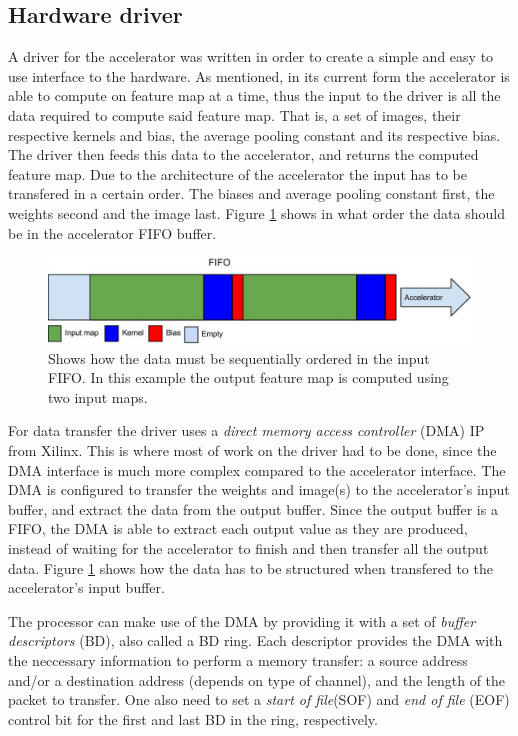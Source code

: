 \subsection{Hardware driver} \label{sec_hardware_driver}

A driver for the accelerator was written in order to create a simple and easy to use interface to the hardware. As mentioned, in its current form the accelerator is able to compute on feature map at a time, thus the input to the driver is all the data required to compute said feature map. That is, a set of images, their respective kernels and bias, the average pooling constant and its respective bias. The driver then feeds this data to the accelerator, and returns the computed feature map. Due to the architecture of the accelerator the input has to be transfered in a certain order. The biases and average pooling constant first, the weights second and the image last. Figure \ref{fig_fifo_content} shows in what order the data should be in the accelerator FIFO buffer.


\begin{figure}[h!]
  \centering
      \includegraphics[width=1.0\textwidth]{Figures/Method/FIFO_content}
    \caption{Shows how the data must be sequentially ordered in the input FIFO. In this example the output feature map is computed using two input maps.}
    \label{fig_fifo_content}
\end{figure}

For data transfer the driver uses a \textit{direct memory access controller} (DMA) IP from Xilinx. This is where most of work on the driver had to be done, since the DMA interface is much more complex compared to the accelerator interface. The DMA is configured to transfer the weights and image(s) to the accelerator's input buffer, and extract the data from the output buffer. Since the output buffer is a FIFO, the DMA is able to extract each output value as they are produced, instead of waiting for the accelerator to finish and then transfer all the output data. Figure \ref{fig_fifo_content} shows how the data has to be structured when transfered to the accelerator's input buffer.

The processor can make use of the DMA by providing it with a set of \textit{buffer descriptors} (BD), also called a BD ring. Each descriptor provides the DMA with the neccessary information to perform a memory transfer: a source address and/or a destination address (depends on type of channel), and the length of the packet to transfer. One also need to set a \textit{start of file}(SOF) and \textit{end of file} (EOF) control bit for the first and last BD in the ring, respectively. 

